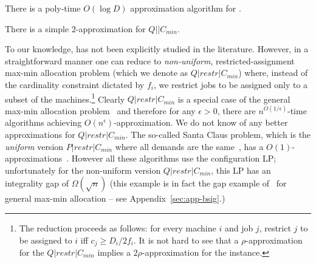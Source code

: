 \begin{theorem}\label{thm:cckp}
	There is a poly-time $O(\log D)$ approximation algorithm for \cckp.
\end{theorem}

\begin{theorem} \label{thm:cckp-soft}
 There is a simple $2$-approximation for $Q || C_{min}$.
 \end{theorem}

	To our knowledge, \cckp has not been explicitly studied in the literature. %
	However, in a straightforward manner one can reduce \cckp to {\em non-uniform}, restricted-assignment max-min allocation problem (which we denote as $Q|restr|C_{min}$) where,  instead of the cardinality constraint dictated by $f_i$, we restrict jobs to be assigned only to a subset of the machines.\footnote{
	The reduction proceeds as follows: for every machine $i$ and job $j$, restrict $j$ to be assigned to $i$ iff $c_j \geq D_i/2f_i$. It is not hard to see that a $\rho$-approximation for the $Q|restr|C_{min}$ implies a $2\rho$-approximation for the \cckp instance.} Clearly $Q|restr|C_{min}$  is a special case of the general max-min allocation problem~\cite{ChakrabartyCK09} and therefore for any $\epsilon>0$, there are $n^{O(1/\epsilon)}$-time algorithms
achieving $O(n^\epsilon)$-approximation. We do not know of any better approximations for $Q|restr|C_{min}$. The so-called Santa Claus problem, which is the {\em uniform} version $P|restr|C_{min}$ where all demands are the same~\cite{BansalS06}, has a $O(1)$-approximations~\cite{Feige08,AsadpourFS12,PolacekS16}. However all these algorithms use the configuration LP; unfortunately for the non-uniform version $Q|restr|C_{min}$, this LP has an integrality gap of $\Omega(\sqrt{n})$ (this example is in fact the gap example of~\cite{BansalS06} for general max-min allocation -- see Appendix~\ref{sec:app-bsig}.)%



